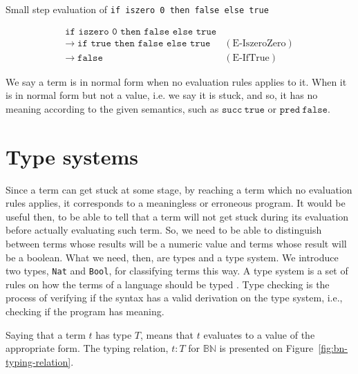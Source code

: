 \begin{example}
    \label{fig:bn-small-step-example}
    Small step evaluation of \texttt{if iszero 0 then false else true}

    \[
        \begin{array}{ll}
            \texttt{if iszero 0 then false else true} & \\
            \rightarrow\; \texttt{if true then false else true} & (\text{E-IszeroZero}) \\
            \rightarrow\; \texttt{false} & (\text{E-IfTrue})
        \end{array}
    \]
\end{example}

We say a term is in normal form when no evaluation rules applies to it.
When it is in normal form but not a value, i.e. we say it is stuck, and
so, it has no meaning according to the given semantics, such as
\(\texttt{succ}\:\texttt{true}\) or \(\texttt{pred}\:\texttt{false}\).

\section{Type systems}\label{sec:type-systems}

Since a term can get stuck at some stage, by reaching a term which no evaluation
rules applies, it corresponds to a meaningless or erroneous program. It would be
useful then, to be able to tell that a term will not get stuck during its evaluation
before actually evaluating such term. So, we need to be able to distinguish between
terms whose results will be a numeric value and terms whose result will be a boolean.
What we need, then, are types and a type system. We introduce two types, \texttt{Nat}
and \texttt{Bool}, for classifying terms this way. A type system is a set of rules on
how the terms of a language should be typed \cite{pierce2002-types-and-programming-languages}. 
Type checking is the process of verifying if the syntax has a valid derivation
on the type system, i.e., checking if the program has meaning.

Saying that a term \(t\) has type \(T\), means that \(t\) evaluates to a value
of the appropriate form. The typing relation, \(t : T\) for \(\mathbb{B}\mathbb{N}\)
is presented on Figure~\ref{fig:bn-typing-relation}.

